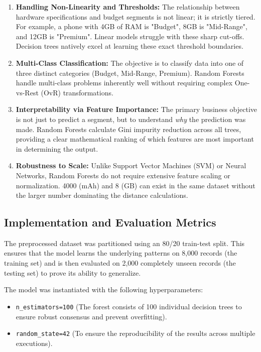 \documentclass[12pt,a4paper]{article}
\begin{document}
\begin{enumerate}
    \item \textbf{Handling Non-Linearity and Thresholds:} The relationship between hardware specifications and budget segments is not linear; it is strictly tiered. For example, a phone with 4GB of RAM is "Budget", 8GB is "Mid-Range", and 12GB is "Premium". Linear models struggle with these sharp cut-offs. Decision trees natively excel at learning these exact threshold boundaries.
    \item \textbf{Multi-Class Classification:} The objective is to classify data into one of three distinct categories (Budget, Mid-Range, Premium). Random Forests handle multi-class problems inherently well without requiring complex One-vs-Rest (OvR) transformations.
    \item \textbf{Interpretability via Feature Importance:} The primary business objective is not just to predict a segment, but to understand \textit{why} the prediction was made. Random Forests calculate Gini impurity reduction across all trees, providing a clear mathematical ranking of which features are most important in determining the output.
    \item \textbf{Robustness to Scale:} Unlike Support Vector Machines (SVM) or Neural Networks, Random Forests do not require extensive feature scaling or normalization. 4000 (mAh) and 8 (GB) can exist in the same dataset without the larger number dominating the distance calculations.
\end{enumerate}

\subsection{Implementation and Evaluation Metrics}
The preprocessed dataset was partitioned using an 80/20 train-test split. This ensures that the model learns the underlying patterns on 8,000 records (the training set) and is then evaluated on 2,000 completely unseen records (the testing set) to prove its ability to generalize.

The model was instantiated with the following hyperparameters:
\begin{itemize}
    \item \texttt{n\_estimators=100} (The forest consists of 100 individual decision trees to ensure robust consensus and prevent overfitting).
    \item \texttt{random\_state=42} (To ensure the reproducibility of the results across multiple executions).
\end{itemize}
\end{document}
